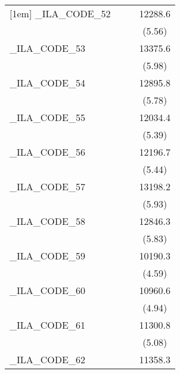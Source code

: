 {\begin{tabular}{l*{3}{c}}
[1em]
\_ILA\_CODE\_52&                     &                     &     12288.6\sym{***}\\
            &                     &                     &      (5.56)         \\
[1em]
\_ILA\_CODE\_53&                     &                     &     13375.6\sym{***}\\
            &                     &                     &      (5.98)         \\
[1em]
\_ILA\_CODE\_54&                     &                     &     12895.8\sym{***}\\
            &                     &                     &      (5.78)         \\
[1em]
\_ILA\_CODE\_55&                     &                     &     12034.4\sym{***}\\
            &                     &                     &      (5.39)         \\
[1em]
\_ILA\_CODE\_56&                     &                     &     12196.7\sym{***}\\
            &                     &                     &      (5.44)         \\
[1em]
\_ILA\_CODE\_57&                     &                     &     13198.2\sym{***}\\
            &                     &                     &      (5.93)         \\
[1em]
\_ILA\_CODE\_58&                     &                     &     12846.3\sym{***}\\
            &                     &                     &      (5.83)         \\
[1em]
\_ILA\_CODE\_59&                     &                     &     10190.3\sym{***}\\
            &                     &                     &      (4.59)         \\
[1em]
\_ILA\_CODE\_60&                     &                     &     10960.6\sym{***}\\
            &                     &                     &      (4.94)         \\
[1em]
\_ILA\_CODE\_61&                     &                     &     11300.8\sym{***}\\
            &                     &                     &      (5.08)         \\
[1em]
\_ILA\_CODE\_62&                     &                     &     11358.3\sym{***}\\

\end{tabular}}
